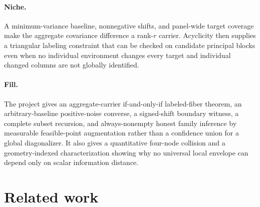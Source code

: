\documentclass{article}
\begin{document}
\paragraph{Niche.} A minimum-variance baseline, nonnegative shifts, and panel-wide target coverage make the aggregate covariance difference a rank-\(r\) carrier.  Acyclicity then supplies a triangular labeling constraint that can be checked on candidate principal blocks even when no individual environment changes every target and individual changed columns are not globally identified.

\paragraph{Fill.} The project gives an aggregate-carrier if-and-only-if labeled-fiber theorem, an arbitrary-baseline positive-noise converse, a signed-shift boundary witness, a complete subset recursion, and always-nonempty honest family inference by measurable feasible-point augmentation rather than a confidence union for a global diagonalizer.  It also gives a quantitative four-node collision and a geometry-indexed characterization showing why no universal local envelope can depend only on scalar information distance.

\section{Related work}
\end{document}
